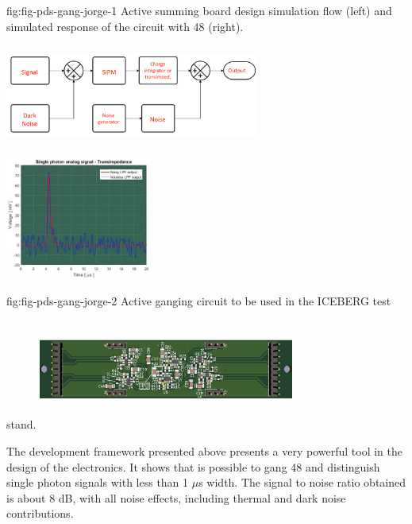 \begin{dunefigure}
 {fig:fig-pds-gang-jorge-1}
 {Active summing board design simulation flow (left) and simulated response of the circuit with 48 (right).}
\includegraphics[angle=0,width=8.4cm,height=4cm]{graphics/pds-gang-jorge-2.png}
\includegraphics[height=4cm]{graphics/pds-gang-jorge-3.png}
\end{dunefigure}

\begin{dunefigure}
 {fig:fig-pds-gang-jorge-2}
 {Active ganging circuit to be used in the ICEBERG test stand.}
\includegraphics[angle=0,width=8.4cm,height=4cm]{graphics/pds-gang-jorge-4.png}
\end{dunefigure}

The development framework presented above presents a very powerful tool in the design of the electronics. It shows that is possible to gang 48  and distinguish single photon signals with less than 1 $\mu$s width.
The signal to noise ratio obtained is about 8 dB, with all noise effects, including thermal and dark noise contributions.

